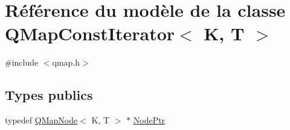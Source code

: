 \hypertarget{class_q_map_const_iterator}{}\section{Référence du modèle de la classe Q\+Map\+Const\+Iterator$<$ K, T $>$}
\label{class_q_map_const_iterator}


{\ttfamily \#include $<$qmap.\+h$>$}

\subsection*{Types publics}
\begin{DoxyCompactItemize}
\item 
typedef \hyperlink{struct_q_map_node}{Q\+Map\+Node}$<$ K, T $>$ $\ast$ \hyperlink{class_q_map_const_iterator_aa466b226e8b1a5bb8dde734c504609c1}{Node\+Ptr}
\end{DoxyCompactItemize}
